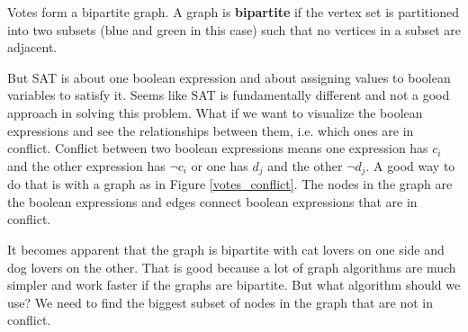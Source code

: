 \begin{marginfigure}[0.01in]
    \caption{Votes form a bipartite graph. A graph is \textbf{bipartite} if the vertex set is partitioned into two subsets (blue and green in this case) such that no vertices in a subset are adjacent.}
	\label{votes_conflict}
\end{marginfigure}

But SAT is about one boolean expression and about assigning values to boolean variables to satisfy it. Seems like SAT is fundamentally different and not a good approach in solving this problem. What if we want to visualize the boolean expressions and see the relationships between them, i.e. which ones are in conflict. Conflict between two boolean expressions means one expression has $c_i$ and the other expression has $\lnot c_i$ or one has $d_j$ and the other $\lnot d_j$. A good way to do that is with a graph as in Figure \ref{votes_conflict}. The nodes in the graph are the boolean expressions and edges connect  boolean expressions that are in conflict.

It becomes apparent that the graph is bipartite with cat lovers on one side and dog lovers on the other. That is good because a lot of graph algorithms are much simpler and work faster if the graphs are bipartite. But what algorithm should we use? We need to find the biggest subset of nodes in the graph that are not in conflict. 

